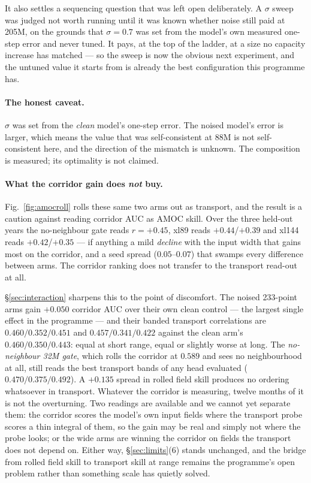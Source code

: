 \documentclass[10pt]{article}
\begin{document}
It also settles a sequencing question that was left open deliberately.
A $\sigma$ sweep was judged not worth running until it was known
whether noise still paid at 205M, on the grounds that $\sigma=0.7$ was
set from the model's own measured one-step error and never tuned. It
pays, at the top of the ladder, at a size no capacity increase has
matched --- so the sweep is now the obvious next experiment, and the
untuned value it starts from is already the best configuration this
programme has.

\paragraph{The honest caveat.} $\sigma$ was set from the \emph{clean}
model's one-step error. The noised model's error is larger, which means
the value that was self-consistent at 88M is not self-consistent here,
and the direction of the mismatch is unknown. The composition is
measured; its optimality is not claimed.

\paragraph{What the corridor gain does \emph{not} buy.}
Fig.~\ref{fig:amocroll} rolls these same two arms out as transport, and
the result is a caution against reading corridor AUC as AMOC skill.
Over the three held-out years the no-neighbour gate reads $r=+0.45$,
xl89 reads $+0.44$/$+0.39$ and xl144 reads $+0.42$/$+0.35$ --- if
anything a mild \emph{decline} with the input width that gains most on
the corridor, and a seed spread ($0.05$--$0.07$) that swamps every
difference between arms. The corridor ranking does not transfer to the
transport read-out at all.

\S\ref{sec:interaction} sharpens this to the point of discomfort. The
noised 233-point arms gain $+0.050$ corridor AUC over their own clean
control --- the largest single effect in the programme --- and their
banded transport correlations are $0.460/0.352/0.451$ and
$0.457/0.341/0.422$ against the clean arm's $0.460/0.350/0.443$: equal
at short range, equal or slightly worse at long. The
\emph{no-neighbour 32M gate}, which rolls the corridor at $0.589$ and
sees no neighbourhood at all, still reads the best transport bands of
any head evaluated ($0.470/0.375/0.492$). A $+0.135$ spread in rolled
field skill produces no ordering whatsoever in transport. Whatever the
corridor is measuring, twelve months of it is not the overturning. Two readings are available and we cannot yet
separate them: the corridor scores the model's own input fields where
the transport probe scores a thin integral of them, so the gain may be
real and simply not where the probe looks; or the wide arms are winning
the corridor on fields the transport does not depend on. Either way,
\S\ref{sec:limits}(6) stands unchanged, and the bridge from rolled field
skill to transport skill at range remains the programme's open problem
rather than something scale has quietly solved.
\end{document}
